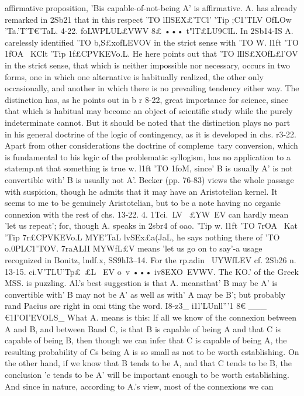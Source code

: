 {{{{affirmative proposition, 'Bis capable-of-not-being A' is affirmative.
A. has already remarked in 2Sb21 that in this respect 'TO lIlSEX£'TCl'
'Tip ;C1'TLV OfLO{w~ 'Ta.'T'T€'TaL.
4-22. foLWPLU\-L£VWV 8£ ••• t"lT£LU9ClL. In 2Sb14-IS A. carelessly
identified 'TO b,S£xofLEVOV in the strict sense with 'TO W. l1ft 'TO 1fOA~
KClt 'Tip 1f£CPVKEVo.L. He here points out that 'TO lIlS£XOfL£l'OV in the
strict sense, that which is neither impossible nor necessary, occurs
in two forms, one in which one alternative is habitually realized,
the other only occasionally, and another in which there is no
prevailing tendency either way. The distinction has, as he points
out in b r 8-22, great importance for science, since that which is
habitual may become an object of scientific study while the
purely indeterminate cannot. But it should be noted that the
distinction plays no part in his general doctrine of the logic of
contingency, as it is developed in chs. r3-22. Apart from other
considerations the doctrine of compleme~tary conversion, which
is fundamental to his logic of the problematic syllogism, has no
application to a statemp.nt that something is true w. l1ft 'TO 1foM,
since' B is usually A' is not convertible with' B is usually not
A'. Becker (pp. 76-83) views the whole passage with suspicion,
though he admits that it may have an Aristotelian kernel. It
seems to me to be genuinely Aristotelian, but to be a note having
no organic connexion with the rest of chs. 13-22.
4. 1Tci.~LV ~£YW~EV can hardly mean 'let us repeat'; for, though
A. speaks in 2sbr4 of oao. 'Tip w. l1ft 'TO 7rOA~ Kat 'Tip 7r£CPVKEVo.L
MYE'TaL lvSEx£a(JaL, he says nothing there of 'TO o.0PLC1'TOV. 7raALII
MYWfL£V means 'let us go on to say'-a usage recognized in Bonitz,
lndf.x, SS9hI3--14. For the rp.adin~ UYWfLEV cf. 2Sb26 n.
13-15. ci.V'TLU'Tp£~£L ~EV o~v ••• iv8EXO~EVWV. The KO.' of the
Greek MSS. is puzzling. Al.'s best suggestion is that A. meansthat' B may be A' is convertible with' B may not be A' as well
as with' A may be B'; but probably rand Pacius are right in
omi tting the word.
I8-z3_ i1l'LUnll'''1 8€ ___ €1I'OI'EVOLS_ What A. means is this: If
all we know of the connexion between A and B, and between
Band C, is that B is capable of being A and that C is capable of
being B, then though we can infer that C is capable of being A,
the resulting probability of Cs being A is so small as not to be
worth establishing. On the other hand, if we know that B tends
to be A, and that C tends to be B, the conclusion 'c tends to be
A' will be important enough to be worth establishing. And since
in nature, according to A.'s view, most of the connexions we can
}}}}}
